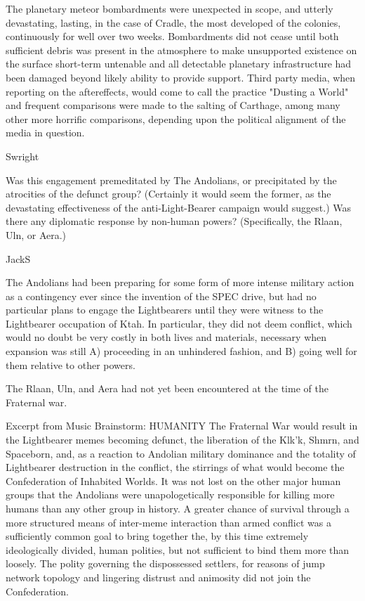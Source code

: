 The planetary meteor bombardments were unexpected in scope, and
utterly devastating, lasting, in the case of Cradle, the most
developed of the colonies, continuously for well over two
weeks. Bombardments did not cease until both sufficient debris was
present in the atmosphere to make unsupported existence on the surface
short-term untenable and all detectable planetary infrastructure had
been damaged beyond likely ability to provide support. Third party
media, when reporting on the aftereffects, would come to call the
practice "Dusting a World" and frequent comparisons were made to the
salting of Carthage, among many other more horrific comparisons,
depending upon the political alignment of the media in question.

Swright

Was this engagement premeditated by The Andolians, or precipitated by
the atrocities of the defunct group? (Certainly it would seem the
former, as the devastating effectiveness of the anti-Light-Bearer
campaign would suggest.) Was there any diplomatic response by
non-human powers? (Specifically, the Rlaan, Uln, or Aera.)

JackS

The Andolians had been preparing for some form of more intense
military action as a contingency ever since the invention of the SPEC
drive, but had no particular plans to engage the Lightbearers until
they were witness to the Lightbearer occupation of Ktah. In
particular, they did not deem conflict, which would no doubt be very
costly in both lives and materials, necessary when expansion was still
A) proceeding in an unhindered fashion, and B) going well for them
relative to other powers.
 
The Rlaan, Uln, and Aera had not yet been encountered at the time of
the Fraternal war.

Excerpt from Music Brainstorm: HUMANITY The Fraternal War would result
in the Lightbearer memes becoming defunct, the liberation of the
Klk'k, Shmrn, and Spaceborn, and, as a reaction to Andolian military
dominance and the totality of Lightbearer destruction in the conflict,
the stirrings of what would become the Confederation of Inhabited
Worlds. It was not lost on the other major human groups that the
Andolians were unapologetically responsible for killing more humans
than any other group in history. A greater chance of survival through
a more structured means of inter-meme interaction than armed conflict
was a sufficiently common goal to bring together the, by this time
extremely ideologically divided, human polities, but not sufficient to
bind them more than loosely. The polity governing the dispossessed
settlers, for reasons of jump network topology and lingering distrust
and animosity did not join the Confederation.

